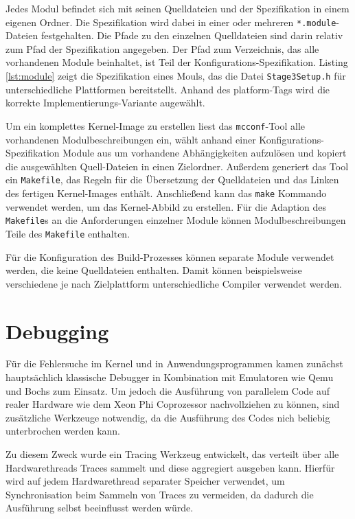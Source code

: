Jedes Modul befindet sich mit seinen Quelldateien und der Spezifikation in 
einem eigenen Ordner. Die Spezifikation wird dabei in einer oder mehreren 
\texttt{*.module}-Dateien festgehalten. Die Pfade zu den einzelnen Quelldateien 
sind darin relativ zum Pfad der Spezifikation angegeben. Der Pfad zum 
Verzeichnis, das alle vorhandenen Module beinhaltet, ist Teil der 
Konfigurations-Spezifikation. Listing \ref{lst:module} zeigt die 
Spezifikation eines Mouls, das die Datei \texttt{Stage3Setup.h} für 
unterschiedliche Plattformen bereitstellt. Anhand des 
platform-Tags wird die korrekte Implementierungs-Variante augewählt.

Um ein komplettes Kernel-Image zu erstellen liest das \texttt{mcconf}-Tool 
alle vorhandenen Modulbeschreibungen ein, wählt anhand einer 
Konfigurations-Spezifikation Module aus um vorhandene Abhängigkeiten aufzulösen 
und kopiert die ausgewählten Quell-Dateien in einen Zielordner.
Außerdem generiert das Tool ein \texttt{Makefile}, das Regeln für die 
Übersetzung der Quelldateien und das Linken des fertigen Kernel-Images enthält.
Anschließend kann das \texttt{make} Kommando verwendet werden, um das 
Kernel-Abbild zu erstellen. Für die Adaption des \texttt{Makefile}s an die 
Anforderungen einzelner Module können Modulbeschreibungen Teile des 
\texttt{Makefile} enthalten.

Für die Konfiguration des Build-Prozesses können separate Module verwendet 
werden, die keine Quelldateien enthalten. Damit können beispielsweise 
verschiedene je nach Zielplattform  unterschiedliche Compiler verwendet werden.


\section{Debugging}
Für die Fehlersuche im Kernel und in Anwendungsprogrammen kamen zunächst 
hauptsächlich klassische Debugger in Kombination mit Emulatoren wie Qemu und 
Bochs zum Einsatz. Um jedoch die Ausführung von parallelem Code auf realer 
Hardware wie dem Xeon Phi Coprozessor nachvollziehen zu können, sind 
zusätzliche Werkzeuge notwendig, da die Ausführung des Codes nich beliebig 
unterbrochen werden kann.

Zu diesem Zweck wurde ein Tracing Werkzeug entwickelt, das verteilt über alle 
Hardwarethreads Traces sammelt und diese aggregiert ausgeben kann. Hierfür wird 
auf jedem Hardwarethread separater Speicher verwendet, um Synchronisation beim 
Sammeln von Traces zu vermeiden, da dadurch die Ausführung selbst beeinflusst 
werden würde.

